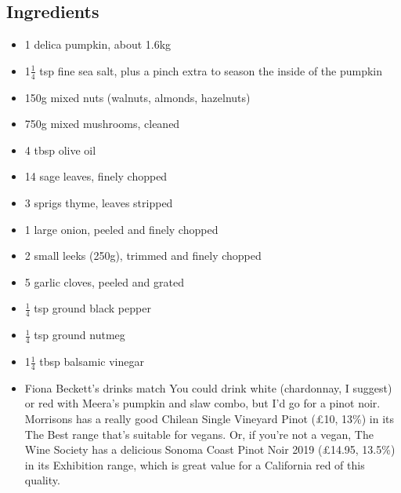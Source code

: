 \documentclass{book}
\begin{document}
\subsection*{Ingredients}
\begin{itemize}
\item 1 delica pumpkin, about 1.6kg
\item 1$\frac{1}{4}$ tsp fine sea salt, plus a pinch extra to season the inside of the pumpkin
\item 150g mixed nuts (walnuts, almonds, hazelnuts)
\item 750g mixed mushrooms, cleaned
\item 4 tbsp olive oil 
\item 14 sage leaves, finely chopped 
\item 3 sprigs thyme, leaves stripped 
\item 1 large onion, peeled and finely chopped
\item 2 small leeks (250g), trimmed and finely chopped 
\item 5 garlic cloves, peeled and grated 
\item $\frac{1}{4}$ tsp ground black pepper
\item $\frac{1}{4}$ tsp ground nutmeg 
\item 1$\frac{1}{4}$ tbsp balsamic vinegar
\end{itemize}

\begin{itemize}
\item Fiona Beckett’s drinks match You could drink white (chardonnay, I suggest) or red with Meera’s pumpkin and slaw combo, but I’d go for a pinot noir. Morrisons has a really good Chilean Single Vineyard Pinot (£10, 13\%) in its The Best range that’s suitable for vegans. Or, if you’re not a vegan, The Wine Society has a delicious Sonoma Coast Pinot Noir 2019 (£14.95, 13.5\%) in its Exhibition range, which is great value for a California red of this quality.
\end{itemize}
\end{document}
